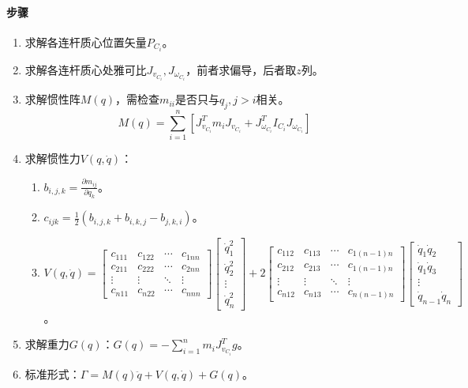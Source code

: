 \documentclass[
12pt, %
a4paper, 
oneside, %
headinclude,footinclude, %
]{scrartcl}
\begin{document}
\paragraph{步骤}
\begin{enumerate}
\item 求解各连杆质心位置矢量$ P_{C_i} $。
\item 求解各连杆质心处雅可比$ J_{v_{C_i}}, J_{\omega_{C_i}} $，前者求偏导，后者取$ z $列。
\item 求解惯性阵$ M(q) $，需检查$ m_{ii} $是否只与$ q_j, j > i $相关。
$$ M(q) = \sum_{i = 1}^{n}[J_{v_{C_i}}^T m_i J_{v_{C_i}} + J_{\omega_{C_i}}^T I_{C_i} J_{\omega_{C_i}}] $$
\item 求解惯性力$ V(q, \dot{q}) $：
\begin{enumerate}
\item $ b_{i,j,k} = \frac{\partial m_{ij}}{\partial q_k} $。
\item $ c_{ijk} = \frac{1}{2}(b_{i,j,k} + b_{i,k,j} - b_{j,k,i}) $。
\item 
$
V(q, \dot{q}) = 
\begin{bmatrix} c_{111} & c_{122} & \cdots & c_{1nn} \\ c_{211} & c_{222} & \cdots & c_{2nn} \\ \vdots & \vdots & \ddots & \vdots \\ c_{n11} & c_{n22} & \cdots & c_{nnn} \end{bmatrix} \begin{bmatrix} \dot{q}_1^2 \\ \dot{q}_2^2 \\ \vdots \\ \dot{q}_n^2 \end{bmatrix}
+ 2\begin{bmatrix} c_{112} & c_{113} & \cdots & c_{1(n - 1)n} \\ c_{212} & c_{213} & \cdots & c_{1(n - 1)n} \\ \vdots & \vdots & \ddots & \vdots \\ c_{n12} & c_{n13} & \cdots & c_{n(n - 1)n} \end{bmatrix} \begin{bmatrix} \dot{q}_1 \dot{q}_2 \\ \dot{q}_1 \dot{q}_3 \\ \vdots \\ \dot{q}_{n - 1} \dot{q}_n \end{bmatrix}
$。
\end{enumerate}
\item 求解重力$ G(q) $：$ G(q) = -\sum_{i = 1}^{n} m_i J_{v_{C_i}}^T g $。
\item 标准形式：$ \Gamma = M(q) \ddot{q} + V(q, \dot{q}) + G(q) $。
\end{enumerate}
\end{document}
